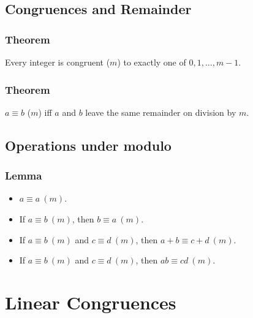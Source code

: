 \documentclass{article}
\begin{document}
\subsection{Congruences and Remainder}
\subsubsection{Theorem}
Every integer is congruent ($m$) to exactly one of $0, 1, ... , m-1$.
\vspace{40px}

\subsubsection{Theorem}
$a \equiv b$ ($m$) iff $a$ and $b$ leave the same remainder on division by $m$.
\vspace{40px}

\subsection{Operations under modulo}
\subsubsection{Lemma}
\begin{itemize}
    \item $a \equiv a \ (m)$.
    \item If $a \equiv b \ (m)$, then $b \equiv a \ (m)$.
    \item If $a \equiv b \ (m)$ and $c \equiv d \ (m)$, then $a+b \equiv c+d \ (m)$.
    \item If $a \equiv b \ (m)$ and $c \equiv d \ (m)$, then $ab \equiv cd \ (m)$.
\end{itemize}
\section{Linear Congruences}
\end{document}
